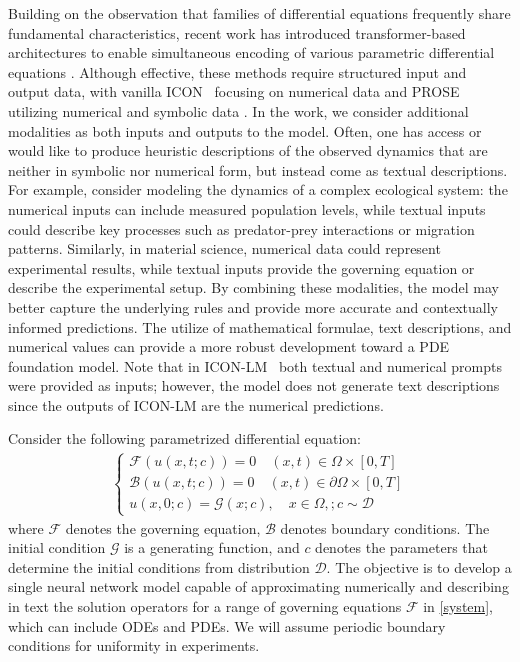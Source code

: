 \documentclass{article}
\begin{document}
Building on the observation that families of differential equations frequently share fundamental characteristics, recent work has introduced transformer-based architectures to enable simultaneous encoding of various parametric differential equations \cite{yang2023context, yang2023fine, yang2024pde, cao2024vicon, liu2024prose,sun2024towards,liu2024prosefd,jollie2024time}. Although effective, these methods require structured input and output data, with vanilla ICON~\cite{yang2023context} focusing on numerical data and PROSE utilizing numerical and symbolic data \cite{liu2024prose,sun2024towards}.
In the work, we consider additional modalities as both inputs and outputs to the model. Often, one has access or would like to produce heuristic descriptions of the observed dynamics that are neither in symbolic nor numerical form, but instead come as textual descriptions. For example, consider modeling the dynamics of a complex ecological system: the numerical inputs can include measured population levels, while textual inputs could describe key processes such as predator-prey interactions or migration patterns. Similarly, in material science, numerical data could represent experimental results, while textual inputs provide the governing equation or describe the experimental setup. By combining these modalities, the model may better capture the underlying rules and provide more accurate and contextually informed predictions. The utilize of mathematical formulae, text descriptions, and numerical values can provide a more robust development toward a PDE foundation model. Note that in ICON-LM~\cite{yang2023fine} both textual and numerical prompts were provided as inputs; however, the model does not generate text descriptions since the outputs of ICON-LM are the numerical predictions. 

Consider the following parametrized differential equation:
\begin{align}\label{system}
    \begin{cases}
        \mathcal{F}(u(x,t;c))=0 \quad (x,t)\in \Omega\times[0,T]\\
        \mathcal{B}(u(x,t;c))=0 \quad (x,t)\in \partial\Omega\times[0,T]\\
        u(x,0;c)=\mathcal{G}(x;c), \quad x\in \Omega,; c \sim \mathcal{D}
    \end{cases}
\end{align}
where $\mathcal{F}$ denotes the governing equation, $\mathcal{B}$ denotes boundary conditions. The initial condition $\mathcal{G}$ is a generating function, and $c$ denotes the parameters that determine the initial conditions from distribution $\mathcal{D}$. The objective is to develop a single neural network model capable of approximating numerically and describing in text the solution operators for a range of governing equations $\mathcal{F}$ in \eqref{system}, which can include ODEs and PDEs. We will assume periodic boundary conditions for uniformity in experiments.
\end{document}
